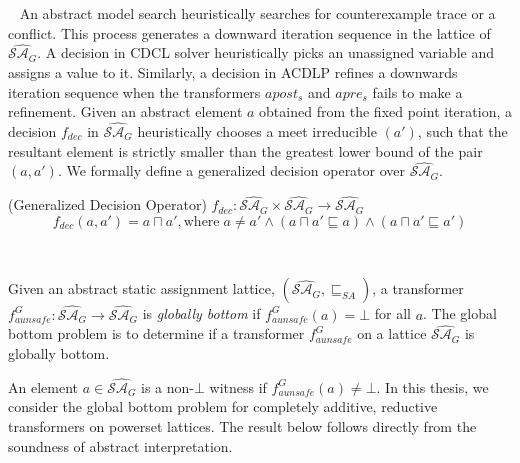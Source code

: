 %
%
%
%
~\label{decision}
%
An abstract model search heuristically searches for counterexample trace or a conflict.
This process generates a downward iteration sequence in the lattice of
$\widehat{\mathcal{SA}_{G}}$.  A decision in CDCL solver heuristically picks 
an unassigned variable and assigns a value to it.  
Similarly, a decision in ACDLP refines a downwards iteration sequence when the 
transformers $apost_{s}$ and $apre_{s}$ fails to make a refinement.  Given 
an abstract element $a$ obtained from the fixed point iteration, a decision $f_{dec}$ in 
$\widehat{\mathcal{SA}_{G}}$ heuristically chooses a meet irreducible $(a')$, such that 
the resultant element is strictly smaller than the greatest lower bound of the 
pair $(a, a')$.  We formally define a generalized decision operator over 
$\widehat{\mathcal{SA}_{G}}$. 
%
\begin{definition} (Generalized Decision Operator) 
  $f_{dec} \colon \widehat{\mathcal{SA}_{G}} \times \widehat{\mathcal{SA}_{G}}
  \rightarrow \widehat{\mathcal{SA}_{G}}$  
   \[ f_{dec}(a, a') = 
        a \sqcap a', \text{where}\; a\neq a' \wedge (a \sqcap a' \sqsubseteq a)
        \wedge (a \sqcap a' \sqsubseteq a')
   \]     
\end{definition}
%

~\label{gbpg}
%
\begin{definition}
Given an abstract static assignment lattice, 
$(\widehat{\mathcal{SA}_G}, \sqsubseteq_{SA})$, a 
transformer 
$f_{aunsafe}^{G} : \widehat{\mathcal{SA}_{G}} \rightarrow \widehat{\mathcal{SA}_{G}}$ 
is \emph{globally bottom} if $f_{aunsafe}^G(a) = \bot$ for all $a$.  The global bottom 
problem is to determine if a transformer 
$f_{aunsafe}^G$ on a lattice $\widehat{\mathcal{SA}_{G}}$ is globally bottom.
\end{definition}

An element $a \in \widehat{\mathcal{SA}_{G}}$ is a non-$\bot$ witness if 
$f_{aunsafe}^G(a) \neq \bot$.  In this thesis, we consider the global bottom 
problem for completely additive, reductive transformers on powerset lattices.  
The result below follows directly from the soundness of abstract interpretation. 

